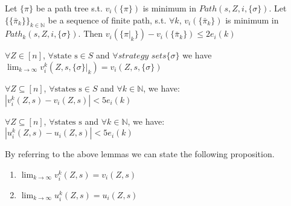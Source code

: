 				\begin{lemma}
					\label{lem : opt_finite_path5}
					Let $\{ \pi \}$ be a path tree s.t. $v_i(\{\pi\})$ is minimum in $Path(s,Z,i,\{\sigma\})$. Let $\{\{\bar\pi_k \} \}_{k \in \mathbb{N}}$ be a sequence of finite path, s.t. $\forall k$, $v_i(\{\bar\pi_k   \})$ is minimum in $Path_k(s,Z,i,\{\sigma\})$. Then $v_i(\{\pi|_k\})-v_i(\{\bar\pi_k\}) \le 2e_i(k)$
					\end{lemma}\cite{MariPhD}
					
					\begin{lemma}
						\label{lem : opt_finite_strat6}
						$\forall Z \in [n]$, $\forall \text{state s} \in S$ and $\forall strategy$ $sets \{\sigma\}$ we have \\
						$\lim_{k\to\infty} v_i^{k}(Z,s,\{\sigma\}|_k) = v_i(Z,s,\{\sigma\}) $
						\end{lemma}\cite{MariPhD}
						
						\begin{lemma}
							\label{lem : conv_vi7}
							$\forall Z \subseteq [n]$, $\forall \text{states s} \in S$ and $\forall k \in \mathbb{N}$, we have:\\
							$|v_i^{k}(Z,s)-v_i(Z,s)| < 5e_i(k)$
							\end{lemma}\cite{MariPhD}
							
							\begin{lemma}
								\label{lem : conv_ui8}
								$\forall Z \subseteq [n]$, $\forall \text{states s}$ and $\forall k \in \mathbb{N}$, we have: \\
								$|u_i^{k}(Z,s) - u_i(Z,s)| < 5e_i(k)$
								\end{lemma}\cite{MariPhD}
								
								By referring to the above lemmas we can state the following proposition. \\
								
								\begin{proposition}
									\begin{enumerate}
										\item $\lim_{k\to\infty} v_i^{k}(Z,s)=v_i(Z,s)$
										\item $\lim_{k\to\infty} u_i^{k}(Z,s)=u_i(Z,s)$
										\end{enumerate}
										\end{proposition} \cite{MariPhD}
										
